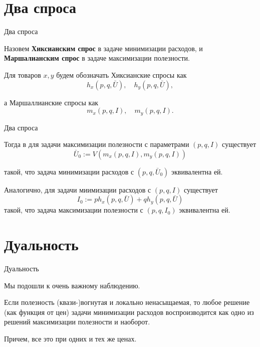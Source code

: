 \documentclass{beamer}
\begin{document}
\section{Два спроса}

\begin{frame}{Два спроса}

\begin{definition}
Назовем \textbf{Хиксианским спрос} в задаче минимизации расходов, и \textbf{Маршалианским спрос} в задаче максимизации полезности. 
\end{definition}

Для товаров $x,y$ будем обозначать Хиксианские спросы как 
$$h_x(p,q,\bar U), \quad h_y(p,q,\bar U),$$

а Маршаллианские спросы как
$$m_x(p,q,I), \quad m_y(p,q,I).$$

\end{frame}

\begin{frame}{Два спроса}

Тогда в для задачи максимизации полезности с параметрами $(p,q,I)$ существует 
$$ \bar U_0 := V(m_x(p,q,I), m_y(p,q,I))$$

такой, что задача минимизации расходов с $(p, q, \bar U_0)$ эквивалентна ей. 

Аналогично, для задачи миимизации расходов с $(p, q, I)$ существует
$$ I_0 := p h_x(p,q, \bar U) + q h_y(p,q, \bar U)$$
такой, что задача максимизации полезности с $(p, q, I_0)$ эквивалентна ей. 

\end{frame}

\section{Дуальность}

\begin{frame}{Дуальность}

Мы подошли к очень важному наблюдению.

\begin{theorem}[Дуальность]

Если полезность (квази-)вогнутая и локально ненасыщаемая, то любое решение (как функция от цен) задачи минимизации расходов воспроизводится как одно из решений максимизации полезности и наоборот.
\end{theorem}
Причем, все это при одних и тех же ценах.

\end{frame}
\end{document}
